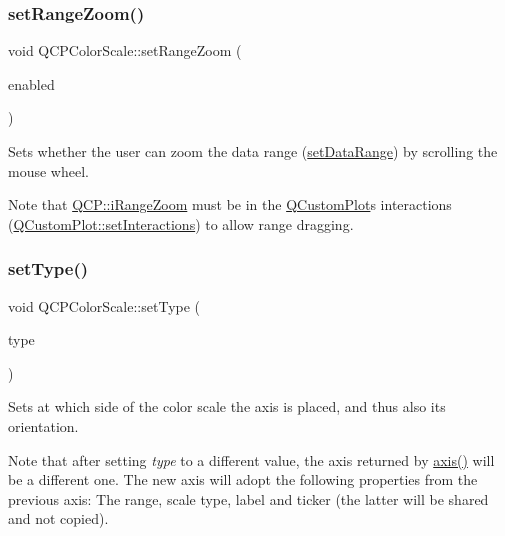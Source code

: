 \subsubsection{\texorpdfstring{set\+Range\+Zoom()}{setRangeZoom()}}
{\footnotesize\ttfamily void Q\+C\+P\+Color\+Scale\+::set\+Range\+Zoom (\begin{DoxyParamCaption}\item[{bool}]{enabled }\end{DoxyParamCaption})}

Sets whether the user can zoom the data range (\hyperlink{class_q_c_p_color_scale_abe88633003a26d1e756aa74984587fef}{set\+Data\+Range}) by scrolling the mouse wheel.

Note that \hyperlink{namespace_q_c_p_a2ad6bb6281c7c2d593d4277b44c2b037abee1e94353525a636aeaf0ba32b72e14}{Q\+C\+P\+::i\+Range\+Zoom} must be in the \hyperlink{class_q_custom_plot}{Q\+Custom\+Plot}\textquotesingle{}s interactions (\hyperlink{class_q_custom_plot_a5ee1e2f6ae27419deca53e75907c27e5}{Q\+Custom\+Plot\+::set\+Interactions}) to allow range dragging. \mbox{\label{class_q_c_p_color_scale_a1bf9bdb291927c422dd66b404b206f1f}} 
\subsubsection{\texorpdfstring{set\+Type()}{setType()}}
{\footnotesize\ttfamily void Q\+C\+P\+Color\+Scale\+::set\+Type (\begin{DoxyParamCaption}\item[{\hyperlink{class_q_c_p_axis_ae2bcc1728b382f10f064612b368bc18a}{Q\+C\+P\+Axis\+::\+Axis\+Type}}]{type }\end{DoxyParamCaption})}

Sets at which side of the color scale the axis is placed, and thus also its orientation.

Note that after setting {\itshape type} to a different value, the axis returned by \hyperlink{class_q_c_p_color_scale_a39bdbdb3b212602a5a57f9f3ea444190}{axis()} will be a different one. The new axis will adopt the following properties from the previous axis\+: The range, scale type, label and ticker (the latter will be shared and not copied). \mbox{\label{class_q_c_p_color_scale_a259dcb6d3053a2cc3c197e9b1191ddbe}} 
